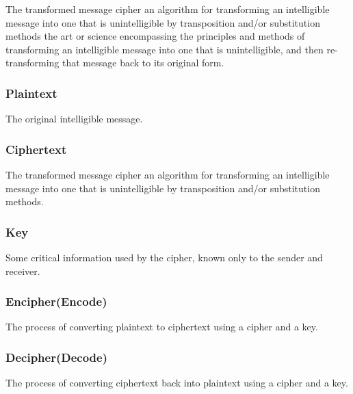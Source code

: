 \documentclass[10pt,british]{article}
\begin{document}
The transformed message cipher an algorithm for transforming an intelligible
message into one that is unintelligible by transposition and/or substitution
methods the art or science encompassing the principles and methods
of transforming an intelligible message into one that is unintelligible,
and then re-transforming that message back to its original form.

\subsubsection{Plaintext}

The original intelligible message.

\subsubsection{Ciphertext}

The transformed message cipher an algorithm for transforming an intelligible
message into one that is unintelligible by transposition and/or substitution
methods.

\noindent{}

\subsubsection{Key}

Some critical information used by the cipher, known only to the sender
and receiver.

\subsubsection{Encipher(Encode)}

The process of converting plaintext to ciphertext using a cipher and
a key.

\subsubsection{Decipher(Decode)}

The process of converting ciphertext back into plaintext using a cipher
and a key.
\end{document}
